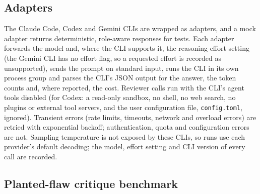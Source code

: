 \documentclass[10pt,letterpaper]{article}
\begin{document}
\subsection*{Adapters}

The Claude Code, Codex and Gemini CLIs are wrapped as adapters, and a mock adapter returns deterministic, role-aware responses for tests. Each adapter forwards the model and, where the CLI supports it, the reasoning-effort setting (the Gemini CLI has no effort flag, so a requested effort is recorded as unsupported), sends the prompt on standard input, runs the CLI in its own process group and parses the CLI's JSON output for the answer, the token counts and, where reported, the cost. Reviewer calls run with the CLI's agent tools disabled (for Codex: a read-only sandbox, no shell, no web search, no plugins or external tool servers, and the user configuration file, \texttt{config.toml}, ignored). Transient errors (rate limits, timeouts, network and overload errors) are retried with exponential backoff; authentication, quota and configuration errors are not. Sampling temperature is not exposed by these CLIs, so runs use each provider's default decoding; the model, effort setting and CLI version of every call are recorded.

\subsection*{Planted-flaw critique benchmark}
\end{document}
